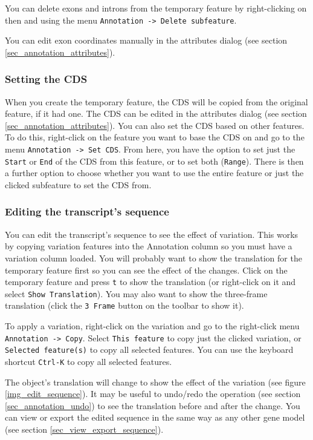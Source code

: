 \documentclass[letterpaper]{article}
\begin{document}
You can delete exons and introns from the temporary feature by right-clicking on then and using the menu \lstinline{Annotation -> Delete subfeature}.

You can edit exon coordinates manually in the attributes dialog (see section \ref{sec_annotation_attributes}).

\subsubsection{Setting the CDS}
When you create the temporary feature, the CDS will be copied from the original feature, if it had one. The CDS can be edited in the attributes dialog (see section \ref{sec_annotation_attributes}). You can also set the CDS based on other features. To do this, right-click on the feature you want to base the CDS on and go to the menu \lstinline{Annotation -> Set CDS}. From here, you have the option to set just the \lstinline{Start} or \lstinline{End} of the CDS from this feature, or to set both (\lstinline{Range}). There is then a further option to choose whether you want to use the entire feature or just the clicked subfeature to set the CDS from.

\subsubsection{Editing the transcript's sequence} \label{sec_edit_sequence}
You can edit the transcript's sequence to see the effect of variation. This works by copying variation features into the Annotation column so you must have a variation column loaded. You will probably want to show the translation for the temporary feature first so you can see the effect of the changes. Click on the temporary feature and press \lstinline{t} to show the translation (or right-click on it and select \lstinline{Show Translation}). You may also want to show the three-frame translation (click the \lstinline{3 Frame} button on the toolbar to show it).

To apply a variation, right-click on the variation and go to the right-click menu \lstinline{Annotation -> Copy}. Select \lstinline{This feature} to copy just the clicked variation, or \lstinline{Selected feature(s)} to copy all selected features. You can use the keyboard shortcut \lstinline{Ctrl-K} to copy all selected features.

The object's translation will change to show the effect of the variation (see figure \ref{img_edit_sequence}). It may be useful to undo/redo the operation (see section \ref{sec_annotation_undo}) to see the translation before and after the change. You can view or export the edited sequence in the same way as any other gene model (see section \ref{sec_view_export_sequence}).
\end{document}

